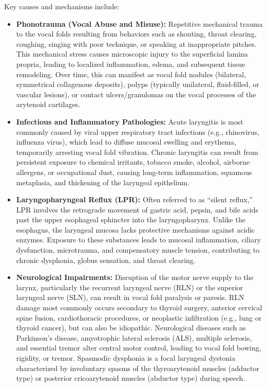 Key causes and mechanisms include:
\begin{itemize}
    \item \textbf{Phonotrauma (Vocal Abuse and Misuse):} Repetitive mechanical trauma to the vocal folds resulting from behaviors such as shouting, throat clearing, coughing, singing with poor technique, or speaking at inappropriate pitches. This mechanical stress causes microscopic injury to the superficial lamina propria, leading to localized inflammation, edema, and subsequent tissue remodeling. Over time, this can manifest as vocal fold nodules (bilateral, symmetrical collagenous deposits), polyps (typically unilateral, fluid-filled, or vascular lesions), or contact ulcers/granulomas on the vocal processes of the arytenoid cartilages.
    \item \textbf{Infectious and Inflammatory Pathologies:} Acute laryngitis is most commonly caused by viral upper respiratory tract infections (e.g., rhinovirus, influenza virus), which lead to diffuse mucosal swelling and erythema, temporarily arresting vocal fold vibration. Chronic laryngitis can result from persistent exposure to chemical irritants, tobacco smoke, alcohol, airborne allergens, or occupational dust, causing long-term inflammation, squamous metaplasia, and thickening of the laryngeal epithelium.
    \item \textbf{Laryngopharyngeal Reflux (LPR):} Often referred to as ``silent reflux,'' LPR involves the retrograde movement of gastric acid, pepsin, and bile acids past the upper esophageal sphincter into the laryngopharynx. Unlike the esophagus, the laryngeal mucosa lacks protective mechanisms against acidic enzymes. Exposure to these substances leads to mucosal inflammation, ciliary dysfunction, microtrauma, and compensatory muscle tension, contributing to chronic dysphonia, globus sensation, and throat clearing.
    \item \textbf{Neurological Impairments:} Disruption of the motor nerve supply to the larynx, particularly the recurrent laryngeal nerve (RLN) or the superior laryngeal nerve (SLN), can result in vocal fold paralysis or paresis. RLN damage most commonly occurs secondary to thyroid surgery, anterior cervical spine fusion, cardiothoracic procedures, or neoplastic infiltration (e.g., lung or thyroid cancer), but can also be idiopathic. Neurological diseases such as Parkinson's disease, amyotrophic lateral sclerosis (ALS), multiple sclerosis, and essential tremor alter central motor control, leading to vocal fold bowing, rigidity, or tremor. Spasmodic dysphonia is a focal laryngeal dystonia characterized by involuntary spasms of the thyroarytenoid muscles (adductor type) or posterior cricoarytenoid muscles (abductor type) during speech.

\end{itemize}
